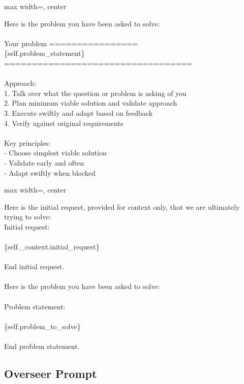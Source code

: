 {
\begin{adjustbox}{max width=\linewidth, center}
\begin{tracebox}
Here is the problem you have been asked to solve:\\
\\
Your problem ================\\
\{self.problem\_statement\}\\
==================================\\
\\
Approach:\\
1. Talk over what the question or problem is asking of you\\
2. Plan minimum viable solution and validate approach\\
3. Execute swiftly and adapt based on feedback\\
4. Verify against original requirements\\
\\
Key principles:\\
- Choose simplest viable solution\\
- Validate early and often\\
- Adapt swiftly when blocked\\
\end{tracebox}
\end{adjustbox}
}


{
\begin{adjustbox}{max width=\linewidth, center}
\begin{tracebox}
Here is the initial request, provided for context only, that we are ultimately trying to solve:\\
Initial request:\\
\\
\{self.\_context.initial\_request\}\\
\\
End initial request.\\
\\
Here is the problem you have been asked to solve:\\
\\
Problem statement:\\
\\
\{self.problem\_to\_solve\}\\
\\
End problem statement.
\end{tracebox}
\end{adjustbox}
}

\subsection{Overseer Prompt}%
\label{subsec:overseer_prompt}

